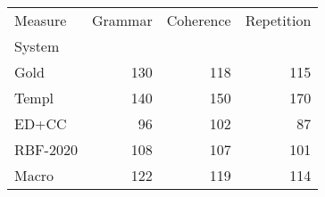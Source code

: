 \begin{tabular}{lrrr}
\toprule
Measure & Grammar & Coherence & Repetition \\
System &  &  &  \\
\midrule
Gold & 130 & 118 & 115 \\
Templ & 140 & 150 & 170 \\
ED+CC & 96 & 102 & 87 \\
RBF-2020 & 108 & 107 & 101 \\
Macro & 122 & 119 & 114 \\
\bottomrule
\end{tabular}
